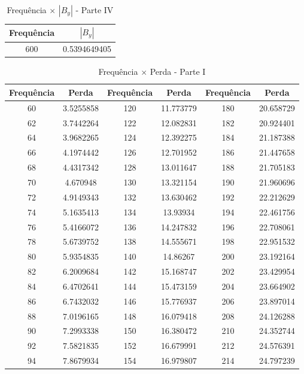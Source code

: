 \documentclass[
	12pt,				%
	openright,			%
	twoside,			%
	a4paper,			%
	english,			%
	french,				%
	spanish,			%
	brazil,				%
	]{abntex2}
\begin{document}
\begin{apendicesenv}
\begin{table}[H]
\begin{tabular}{c c| c c | c c}
\end{tabular}
\end{table}

\newpage
\begin{table}[H]
\caption{Frequência  $\times$ $|B_{y}|$ - Parte IV}
\centering
\begin{tabular}{c c}
Frequência & $|B_{y}|$ \\
\hline
600 & 0.5394649405

\end{tabular}
\end{table}


\newpage
\begin{table}[H]
\caption{Frequência  $\times$ Perda - Parte I \label{tab:p_f_i}}
\centering
\begin{tabular}{c c| c c | c c}
Frequência & Perda & Frequência & Perda & Frequência & Perda \\
\hline
60 & 3.5255858 & 120 & 11.773779 & 180 & 20.658729\\
62 & 3.7442264 & 122 & 12.082831 & 182 & 20.924401\\
64 & 3.9682265 & 124 & 12.392275 & 184 & 21.187388\\
66 & 4.1974442 & 126 & 12.701952 & 186 & 21.447658\\
68 & 4.4317342 & 128 & 13.011647 & 188 & 21.705183\\
70 & 4.670948 & 130 & 13.321154 & 190 & 21.960696\\
72 & 4.9149343 & 132 & 13.630462 & 192 & 22.212629\\
74 & 5.1635413 & 134 & 13.93934 & 194 & 22.461756\\
76 & 5.4166072 & 136 & 14.247832 & 196 & 22.708061\\
78 & 5.6739752 & 138 & 14.555671 & 198 & 22.951532\\
80 & 5.9354835 & 140 & 14.86267 & 200 & 23.192164\\
82 & 6.2009684 & 142 & 15.168747 & 202 & 23.429954\\
84 & 6.4702641 & 144 & 15.473159 & 204 & 23.664902\\
86 & 6.7432032 & 146 & 15.776937 & 206 & 23.897014\\
88 & 7.0196165 & 148 & 16.079418 & 208 & 24.126288\\
90 & 7.2993338 & 150 & 16.380472 & 210 & 24.352744\\
92 & 7.5821835 & 152 & 16.679991 & 212 & 24.576391\\
94 & 7.8679934 & 154 & 16.979807 & 214 & 24.797239\\

\end{tabular}
\end{table}
\end{apendicesenv}
\end{document}
